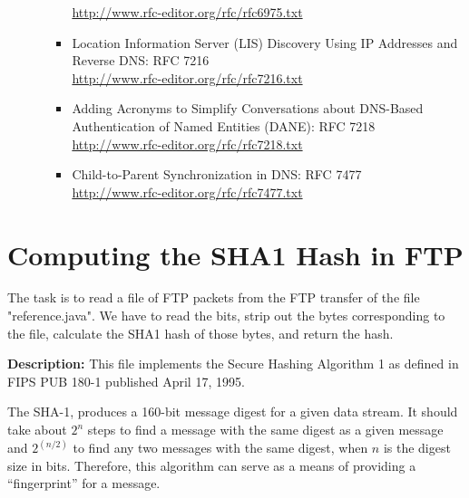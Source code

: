 \begin{itemize}
\begin{itemize}
\begin{itemize}
\url{http://www.rfc-editor.org/rfc/rfc6975.txt}
\item Location Information Server (LIS) Discovery Using IP Addresses 
and Reverse DNS: RFC 7216\\
\url{http://www.rfc-editor.org/rfc/rfc7216.txt}
\item Adding Acronyms to Simplify Conversations about DNS-Based 
Authentication of Named Entities (DANE): RFC 7218\\
\url{http://www.rfc-editor.org/rfc/rfc7218.txt}
\item Child-to-Parent Synchronization in DNS: RFC 7477\\
\url{http://www.rfc-editor.org/rfc/rfc7477.txt}
\end{itemize}
\end{itemize}
\end{itemize}

\section{Computing the SHA1 Hash in FTP}
\vspace{1mm}
\noindent
The task is to read a file of FTP packets from the FTP transfer of the
file "reference.java". We have to read the bits, strip out the bytes
corresponding to the file, calculate the SHA1 hash of those bytes, and
return the hash.

\noindent
{\bf Description:}
This file implements the Secure Hashing Algorithm 1 as
defined in FIPS PUB 180-1 published April 17, 1995.

The SHA-1, produces a 160-bit message digest for a given
data stream.  It should take about $2^n$ steps to find a
message with the same digest as a given message and
$2^{(n/2)}$ to find any two messages with the same digest,
when $n$ is the digest size in bits.  Therefore, this
algorithm can serve as a means of providing a
``fingerprint'' for a message.

